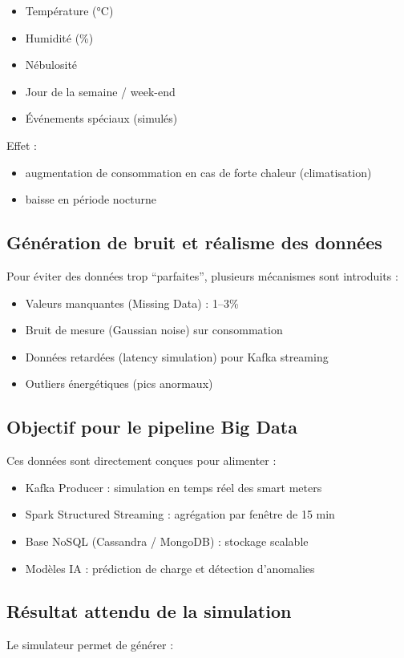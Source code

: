 \documentclass[1pt,a4paper]{report}
\begin{document}
\begin{itemize}
\item Température (°C)
\item Humidité (\%)
\item Nébulosité
\item Jour de la semaine / week-end
\item Événements spéciaux (simulés)
\end{itemize}

Effet :
\begin{itemize}
\item augmentation de consommation en cas de forte chaleur (climatisation)
\item baisse en période nocturne
\end{itemize}

\subsection{Génération de bruit et réalisme des données}
Pour éviter des données trop “parfaites”, plusieurs mécanismes sont introduits :

\begin{itemize}
\item Valeurs manquantes (Missing Data) : 1–3\%
\item Bruit de mesure (Gaussian noise) sur consommation
\item Données retardées (latency simulation) pour Kafka streaming
\item Outliers énergétiques (pics anormaux)
\end{itemize}

\subsection{Objectif pour le pipeline Big Data}
Ces données sont directement conçues pour alimenter :

\begin{itemize}
\item Kafka Producer : simulation en temps réel des smart meters
\item Spark Structured Streaming : agrégation par fenêtre de 15 min
\item Base NoSQL (Cassandra / MongoDB) : stockage scalable
\item Modèles IA : prédiction de charge et détection d’anomalies
\end{itemize}

\subsection{Résultat attendu de la simulation}
Le simulateur permet de générer :
\end{document}
